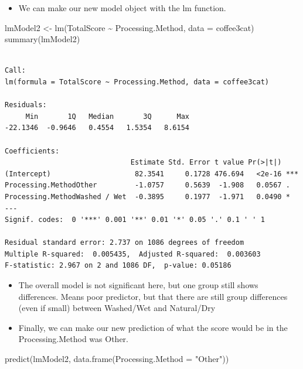 \documentclass[
  letterpaper,
  DIV=11,
  numbers=noendperiod]{scrreprt}
\newenvironment{Shaded}{\begin{snugshade}}{\end{snugshade}}
\newcommand{\AttributeTok}[1]{\textcolor[rgb]{0.40,0.45,0.13}{#1}}
\newcommand{\FunctionTok}[1]{\textcolor[rgb]{0.28,0.35,0.67}{#1}}
\newcommand{\NormalTok}[1]{\textcolor[rgb]{0.00,0.23,0.31}{#1}}
\newcommand{\OtherTok}[1]{\textcolor[rgb]{0.00,0.23,0.31}{#1}}
\newcommand{\SpecialCharTok}[1]{\textcolor[rgb]{0.37,0.37,0.37}{#1}}
\newcommand{\StringTok}[1]{\textcolor[rgb]{0.13,0.47,0.30}{#1}}
\providecommand{\tightlist}{%
  \setlength{\itemsep}{0pt}\setlength{\parskip}{0pt}}\usepackage{longtable,booktabs,array}
\begin{document}
\begin{itemize}
\tightlist
\item
  We can make our new model object with the lm function.
\end{itemize}

\begin{Shaded}
\begin{Highlighting}[]
\NormalTok{lmModel2 }\OtherTok{\textless{}{-}} \FunctionTok{lm}\NormalTok{(TotalScore }\SpecialCharTok{\textasciitilde{}}\NormalTok{ Processing.Method, }\AttributeTok{data =}\NormalTok{ coffee3cat)}
\FunctionTok{summary}\NormalTok{(lmModel2)}
\end{Highlighting}
\end{Shaded}

\begin{verbatim}

Call:
lm(formula = TotalScore ~ Processing.Method, data = coffee3cat)

Residuals:
     Min       1Q   Median       3Q      Max 
-22.1346  -0.9646   0.4554   1.5354   8.6154 

Coefficients:
                              Estimate Std. Error t value Pr(>|t|)    
(Intercept)                    82.3541     0.1728 476.694   <2e-16 ***
Processing.MethodOther         -1.0757     0.5639  -1.908   0.0567 .  
Processing.MethodWashed / Wet  -0.3895     0.1977  -1.971   0.0490 *  
---
Signif. codes:  0 '***' 0.001 '**' 0.01 '*' 0.05 '.' 0.1 ' ' 1

Residual standard error: 2.737 on 1086 degrees of freedom
Multiple R-squared:  0.005435,  Adjusted R-squared:  0.003603 
F-statistic: 2.967 on 2 and 1086 DF,  p-value: 0.05186
\end{verbatim}

\begin{itemize}
\tightlist
\item
  The overall model is not significant here, but one group still shows
  differences. Means poor predictor, but that there are still group
  differences (even if small) between Washed/Wet and Natural/Dry
\item
  Finally, we can make our new prediction of what the score would be in
  the Processing.Method was Other.
\end{itemize}

\begin{Shaded}
\begin{Highlighting}[]
\FunctionTok{predict}\NormalTok{(lmModel2, }\FunctionTok{data.frame}\NormalTok{(}\AttributeTok{Processing.Method =} \StringTok{"Other"}\NormalTok{))}
\end{Highlighting}
\end{Shaded}
\end{document}
